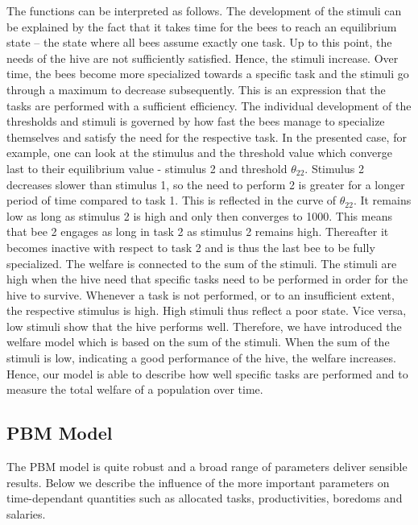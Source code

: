 The functions can be interpreted as follows. The development of the stimuli can be explained by the fact that it takes time for the bees to reach an equilibrium state -- the state where all bees assume exactly one task. Up to this point, the needs of the hive are not sufficiently satisfied. Hence, the stimuli increase. Over time, the bees become more specialized towards a specific task and the stimuli go through a maximum to decrease subsequently. This is an expression that the tasks are performed with a sufficient efficiency. The individual development of the thresholds and stimuli is governed by how fast the bees manage to specialize themselves and satisfy the need for the respective task. In the presented case, for example, one can look at the stimulus and the threshold value which converge last to their equilibrium value - stimulus 2 and threshold $\theta_{22}$. Stimulus 2 decreases slower than stimulus 1, so the need to perform 2 is greater for a longer period of time compared to task 1. This is reflected in the curve of $\theta_{22}$. It remains low as long as stimulus 2 is high and only then converges to 1000. This means that bee 2 engages as long in task 2 as stimulus 2 remains high. Thereafter it becomes inactive with respect to task 2 and is thus the last bee to be fully specialized. The welfare is connected to the sum of the stimuli. The stimuli are high when the hive need that specific tasks need to be performed in order for the hive to survive. Whenever a task is not performed, or to an insufficient extent, the respective stimulus is high. High stimuli thus reflect a poor state. Vice versa, low stimuli show that the hive performs well. Therefore, we have introduced the welfare model which is based on the sum of the stimuli. When the sum of the stimuli is low, indicating a good performance of the hive, the welfare increases. Hence, our model is able to describe how well specific tasks are performed and to measure the total welfare of a population over time.


 

\subsection{PBM Model}
The PBM model is quite robust and a broad range of parameters deliver sensible results. Below we describe the influence of the more important parameters on time-dependant quantities such as allocated tasks, productivities, boredoms and salaries. 

